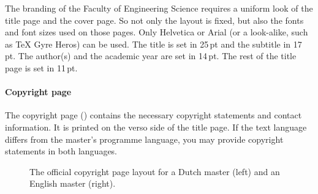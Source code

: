 \documentclass[11pt,article,oneside,british,extralanguage=dutch]{kulemt}
\begin{document}
The branding of the Faculty of Engineering Science requires a uniform look of
the title page and the cover page. So not only the layout is fixed, but also
the fonts and font sizes used on those pages. Only Helvetica or Arial (or a
look-alike, such as TeX Gyre Heros) can be used. The title is set in 25\,pt and
the subtitle in 17\,pt. The author(s) and the academic year are set in 14\,pt.
The rest of the title page is set in 11\,pt.

\paragraph{Copyright page}
The copyright page () contains the necessary copyright
statements and contact information. It is printed on the verso side of the
title page. If the text language differs from the master's programme language,
you may provide copyright statements in both languages.
\begin{figure}
  \centering \fboxsep=0pt
  \qquad
  \caption{The official copyright page layout for a Dutch master (left) and an
    English master (right).}
  \label{fig:copyright}
\end{figure}
\end{document}
